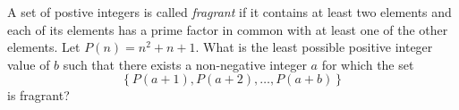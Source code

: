 A set of postive integers is called \emph{fragrant} if it contains at least two elements and each of its elements has a prime factor in common with at least one of the other elements.  Let $P\left(n\right)=n^2+n+1$.  What is the least possible positive integer value of $b$ such that there exists a non-negative integer $a$ for which the set \[\left\{P\left(a+1\right),P\left(a+2\right),\ldots,P\left(a+b\right)\right\}\] is fragrant?